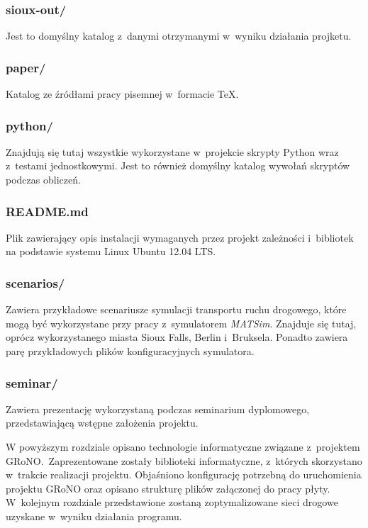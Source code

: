 \documentclass[twoside,12pt]{report}
\begin{document}
\subsubsection{sioux-out/}
Jest to domyślny katalog z~danymi otrzymanymi w~wyniku działania projketu.

\subsubsection{paper/}
Katalog ze źródłami pracy pisemnej w~formacie TeX.

\subsubsection{python/}
Znajdują się tutaj wszystkie wykorzystane w~projekcie skrypty Python wraz z~testami jednostkowymi. Jest to również domyślny katalog wywołań skryptów podczas obliczeń.

\subsubsection{README.md}
Plik zawierający opis instalacji wymaganych przez projekt zależności i~bibliotek na podstawie systemu Linux Ubuntu 12.04 LTS.

\subsubsection{scenarios/}
Zawiera przykładowe scenariusze symulacji transportu ruchu drogowego, które mogą być wykorzystane przy pracy z~symulatorem \textit{MATSim}. Znajduje się tutaj, oprócz wykorzystanego miasta Sioux Falls, Berlin i~Bruksela. Ponadto zawiera parę przykładowych plików konfiguracyjnych symulatora.

\subsubsection{seminar/}
Zawiera prezentację wykorzystaną podczas seminarium dyplomowego, przedstawiającą wstępne założenia projektu.

W powyższym rozdziale opisano technologie informatyczne związane z~projektem GRoNO.~Zaprezentowane zostały biblioteki informatyczne, z~których skorzystano w~trakcie realizacji projektu. Objaśniono konfigurację potrzebną do uruchomienia projektu GRoNO oraz opisano strukturę plików załączonej do pracy płyty. W~kolejnym rozdziale przedstawione zostaną zoptymalizowane sieci drogowe uzyskane w~wyniku działania programu.
\end{document}
